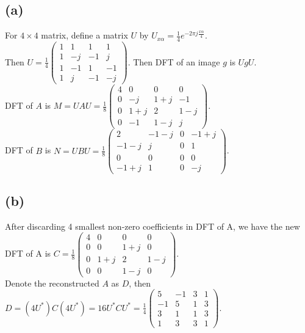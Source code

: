 \documentclass[12pt]{article}
\begin{document}
    \subsection*{(a)}
    For $4 \times 4$ matrix, define a matrix $U$ by $U_{x\alpha} = \frac{1}{4} e^{-2 \pi j \frac{x\alpha}{4}}$.\\
    Then $U = \frac{1}{4} \begin{pmatrix} 1&1&1&1 \\ 1&-j&-1&j \\ 1&-1&1&-1 \\ 1&j&-1&-j \end{pmatrix}$. Then DFT of an image $g$ is $UgU$.\\
    DFT of $A$ is $M = UAU = \frac{1}{8} \begin{pmatrix} 4&0&0&0 \\ 0&-j&1+j&-1 \\ 0&1+j&2&1-j \\ 0&-1&1-j&j \end{pmatrix}$.\\
    DFT of $B$ is $N = UBU = \frac{1}{8} \begin{pmatrix} 2&-1-j&0&-1+j \\ -1-j&j&0&1 \\ 0&0&0&0 \\ -1+j&1&0&-j \end{pmatrix}$.
    \subsection*{(b)}
    After discarding 4 smallest non-zero coefficients in DFT of A, we have the new DFT of A is $C = \frac{1}{8} \begin{pmatrix} 4&0&0&0 \\ 0&0&1+j&0 \\ 0&1+j&2&1-j \\ 0&0&1-j&0 \end{pmatrix}$.\\
    Denote the reconstructed $A$ as $D$, then\\
    $D = (4U^*)C(4U^*) = 16U^*CU^* = \frac{1}{4} \begin{pmatrix}
        5&-1&3&1 \\ -1&5&1&3 \\ 3&1&1&3 \\ 1&3&3&1
    \end{pmatrix}$.
\end{document}
